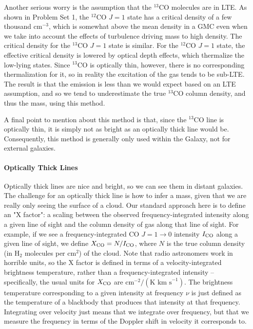 Another serious worry is the assumption that the $^{13}$CO molecules are in LTE. As shown in Problem Set 1, the $^{12}$CO $J=1$ state has a critical density of a few thousand cm$^{-3}$, which is somewhat above the mean density in a GMC even when we take into account the effects of turbulence driving mass to high density. The critical density for the $^{13}$CO $J=1$ state is similar. For the $^{12}$CO $J=1$ state, the effective critical density is lowered by optical depth effects, which thermalize the low-lying states. Since $^{13}$CO is optically thin, however, there is no corresponding thermalization for it, so in reality the excitation of the gas tends to be sub-LTE. The result is that the emission is less than we would expect based on an LTE assumption, and so we tend to underestimate the true $^{13}$CO column density, and thus the mass, using this method.

A final point to mention about this method is that, since the $^{13}$CO line is optically thin, it is simply not as bright as an optically thick line would be. Consequently, this method is generally only used within the Galaxy, not for external galaxies.

\paragraph{Optically Thick Lines}

Optically thick lines are nice and bright, so we can see them in distant galaxies. The challenge for an optically thick line is how to infer a mass, given that we are really only seeing the surface of a cloud. Our standard approach here is to define an "X factor": a scaling between the observed frequency-integrated intensity along a given line of sight and the column density of gas along that line of sight. For example, if we see a frequency-integrated CO $J=1\rightarrow 0$ intensity $I_{\rm CO}$ along a given line of sight, we define $X_{\rm CO}=N/I_{\rm CO}$, where $N$ is the true column density (in H$_2$ molecules per cm$^2$) of the cloud. Note that radio astronomers work in horrible units, so the X factor is defined in terms of a velocity-integrated brightness temperature, rather than a frequency-integrated intensity -- specifically, the usual units for $X_{\rm CO}$ are $\mbox{cm}^{-2} / (\mbox{K km s}^{-1})$. The brightness temperature corresponding to a given intensity at frequency $\nu$ is just defined as the temperature of a blackbody that produces that intensity at that frequency. Integrating over velocity just means that we integrate over frequency, but that we measure the frequency in terms of the Doppler shift in velocity it corresponds to.

